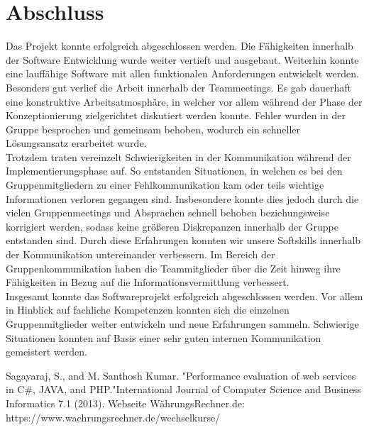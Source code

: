 \documentclass[conference]{IEEEtran}
\begin{document}
\section{Abschluss}
Das Projekt konnte erfolgreich abgeschlossen werden. Die Fähigkeiten innerhalb der Software Entwicklung wurde weiter vertieft und ausgebaut. Weiterhin konnte eine lauffähige Software mit allen funktionalen Anforderungen entwickelt werden.
Besonders gut verlief die Arbeit innerhalb der Teammeetings. Es gab dauerhaft eine konstruktive Arbeitsatmosphäre, in welcher vor allem während der Phase der Konzeptionierung zielgerichtet diskutiert werden konnte. Fehler wurden in der Gruppe besprochen und gemeinsam behoben, wodurch ein schneller Lösungsansatz erarbeitet wurde.\\
Trotzdem traten vereinzelt Schwierigkeiten in der Kommunikation während der Implementierungsphase auf. So entstanden Situationen, in welchen es bei den Gruppenmitgliedern zu einer Fehlkommunikation kam oder teils wichtige Informationen verloren gegangen sind. Insbesondere konnte dies jedoch durch die vielen Gruppenmeetings und Absprachen schnell behoben beziehungsweise korrigiert werden, sodass keine größeren Diskrepanzen innerhalb der Gruppe entstanden sind. Durch diese Erfahrungen konnten wir unsere Softskills innerhalb der Kommunikation untereinander verbessern. Im Bereich der Gruppenkommunikation haben die Teammitglieder über die Zeit hinweg ihre Fähigkeiten in Bezug auf die Informationsvermittlung verbessert.\\
Insgesamt konnte das Softwareprojekt erfolgreich abgeschlossen werden. Vor allem in Hinblick auf fachliche Kompetenzen konnten sich die einzelnen Gruppenmitglieder weiter entwickeln und neue Erfahrungen sammeln. Schwierige Situationen konnten auf Basis einer sehr guten internen Kommunikation gemeistert werden.


\begin{thebibliography}{99}
	Sagayaraj, S., and M. Santhosh Kumar. "Performance evaluation of web services in C\#, JAVA, and PHP."\space International Journal of Computer Science and Business Informatics 7.1 (2013).
	Webseite WährungsRechner.de: \\https://www.waehrungsrechner.de/wechselkurse/
\end{thebibliography}
\end{document}
